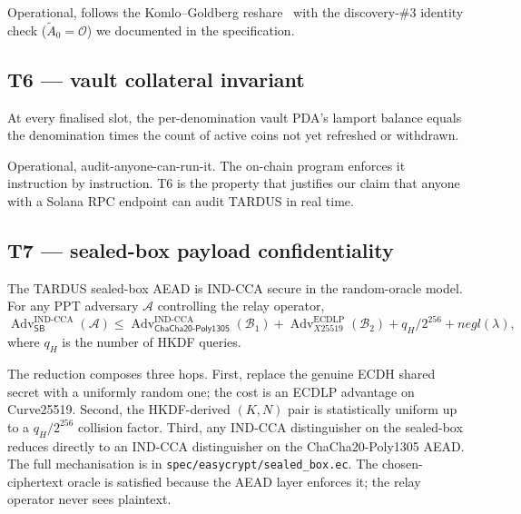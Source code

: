 Operational, follows the Komlo--Goldberg reshare~\cite{komlogoldberg2020} with the discovery-\#3 identity check ($\tilde{A}_0 = \mathcal{O}$) we documented in the specification.

\subsection{T6 --- vault collateral invariant}

\begin{theorem}
\label{thm:T6}
At every finalised slot, the per-denomination vault PDA's lamport balance equals the denomination times the count of active coins not yet refreshed or withdrawn.
\end{theorem}

Operational, audit-anyone-can-run-it. The on-chain program enforces it instruction by instruction. T6 is the property that justifies our claim that anyone with a Solana RPC endpoint can audit TARDUS in real time.

\subsection{T7 --- sealed-box payload confidentiality}
\label{sec:t7}

\begin{theorem}
\label{thm:T7}
The TARDUS sealed-box AEAD is IND-CCA secure in the random-oracle model. For any PPT adversary $\mathcal{A}$ controlling the relay operator,
\[
  \operatorname{Adv}^{\mathrm{IND\text{-}CCA}}_{\mathsf{SB}}(\mathcal{A}) \leq
  \operatorname{Adv}^{\mathrm{IND\text{-}CCA}}_{\mathsf{ChaCha20\text{-}Poly1305}}(\mathcal{B}_1) +
  \operatorname{Adv}^{\mathrm{ECDLP}}_{X25519}(\mathcal{B}_2) +
  q_H / 2^{256} + \mathit{negl}(\lambda),
\]
where $q_H$ is the number of HKDF queries.
\end{theorem}

The reduction composes three hops. First, replace the genuine ECDH shared secret with a uniformly random one; the cost is an ECDLP advantage on Curve25519. Second, the HKDF-derived $(K, N)$ pair is statistically uniform up to a $q_H / 2^{256}$ collision factor. Third, any IND-CCA distinguisher on the sealed-box reduces directly to an IND-CCA distinguisher on the ChaCha20-Poly1305 AEAD. The full mechanisation is in \texttt{spec/easycrypt/sealed\_box.ec}. The chosen-ciphertext oracle is satisfied because the AEAD layer enforces it; the relay operator never sees plaintext.


